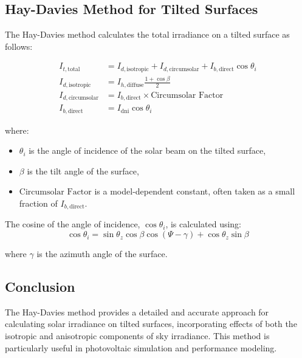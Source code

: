 \subsection*{Hay-Davies Method for Tilted Surfaces}
The Hay-Davies method calculates the total irradiance on a tilted surface as follows:

\begin{align}
I_{t, \text{total}} &= I_{d, \text{isotropic}} + I_{d, \text{circumsolar}} + I_{b, \text{direct}} \cos \theta_i \\
I_{d, \text{isotropic}} &= I_{h, \text{diffuse}} \frac{1 + \cos \beta}{2} \\
I_{d, \text{circumsolar}} &= I_{b, \text{direct}} \times \text{Circumsolar Factor} \\
I_{b, \text{direct}} &= I_{\text{dni}} \cos \theta_i
\end{align}

where:
\begin{itemize}
  \item $\theta_i$ is the angle of incidence of the solar beam on the tilted surface,
  \item $\beta$ is the tilt angle of the surface,
  \item $\text{Circumsolar Factor}$ is a model-dependent constant, often taken as a small fraction of $I_{b, \text{direct}}$.
\end{itemize}

The cosine of the angle of incidence, $\cos \theta_i$, is calculated using:
\begin{equation}
\cos \theta_i = \sin \theta_z \cos \beta \cos(\Psi - \gamma) + \cos \theta_z \sin \beta
\end{equation}

where $\gamma$ is the azimuth angle of the surface.

\subsection*{Conclusion}
The Hay-Davies method provides a detailed and accurate approach for calculating solar irradiance on tilted surfaces, incorporating effects of both the isotropic and anisotropic components of sky irradiance. This method is particularly useful in photovoltaic simulation and performance modeling.

